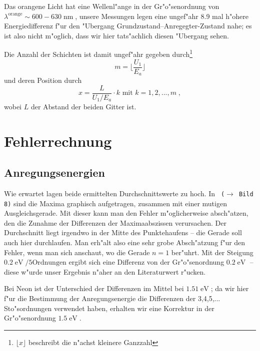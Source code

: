 \documentclass[a4paper,12pt]{article}
\newcommand{\abs}[0]{\bigskip\noindent}
\newcommand{\bild}[1]{\texttt{ ($\rightarrow$ Bild #1)}}
\newcommand{\bildd}[2]{\texttt{ ($\rightarrow$ Bild #1,} #2 \texttt{ )}}
\begin{document}
Das orangene Licht hat eine Wellenl"ange in der Gr"o"senordnung von $\lambda^\text{orange} \sim 600-630 \operatorname{nm}$, unsere Messungen legen eine ungef"ahr 8.9 mal h"ohere Energiedifferenz f"ur den "Ubergang Grundzustand--Anregegter-Zustand nahe; es ist also nicht m"oglich, dass wir hier tats"achlich diesen "Ubergang sehen.



Die Anzahl der Schichten ist damit ungef"ahr gegeben durch\footnote{$\lfloor x \rfloor$ beschreibt die n"achst kleinere Ganzzahl}
\begin{equation}
	m = \lfloor \frac {U_1} {E_a} \rfloor
\end{equation}
und deren Position durch
\begin{equation}
	x = \frac L {U_1 / E_a} \cdot k \text { mit } k = 1,2, ..., m \;,
\end{equation}
wobei $L$ der Abstand der beiden Gitter ist.







\section*{Fehlerrechnung}
\label{sec:fehlerrechnung}


\subsection*{Anregungsenergien}
\label{sec:anregungsenergien-1}

Wie erwartet lagen beide ermittelten Durchschnittswerte zu hoch. In
\bild 8 sind die Maxima graphisch aufgetragen, zusammen mit einer
mutigen Ausgleichsgerade. Mit dieser kann man den Fehler
m"oglicherweise absch"atzen, den die Zunahme der Differenzen der
Maximaabszissen verursachen. Der Durchschnitt liegt irgendwo in der
Mitte des Punktehaufens -- die Gerade soll auch hier durchlaufen. Man
erh"alt also eine sehr grobe Absch"atzung f"ur den Fehler, wenn man sich
anschaut, wo die Gerade $n=1$ ber"uhrt. Mit der Steigung
$0.2\operatorname{eV}/5\text{Ordnungen}$ ergibt sich eine Differenz
von der Gr"o"senordnung $0.2\operatorname{eV}$ -- diese w"urde unser
Ergebnis n"aher an den Literaturwert r"ucken.




\abs
Bei Neon ist der Unterschied der Differenzen im Mittel bei
$1.51\operatorname{eV}$; da wir hier f"ur die Bestimmung der
Anregungsenergie die Differenzen der 3,4,5,... Sto"sordnungen
verwendet haben, erhalten wir eine Korrektur in der Gr"o"senordnung
$1.5\operatorname{eV}$. 
\end{document}
